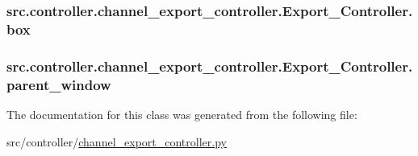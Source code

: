 \subsubsection[{box}]{\setlength{\rightskip}{0pt plus 5cm}src.\+controller.\+channel\+\_\+export\+\_\+controller.\+Export\+\_\+\+Controller.\+box}\label{classsrc_1_1controller_1_1channel__export__controller_1_1Export__Controller_a7e1fa47f17183e725dc98b6c4a15c9a9}
\hypertarget{classsrc_1_1controller_1_1channel__export__controller_1_1Export__Controller_ab5f83ab03c0824d54acd7a21e1f36813}{}
\subsubsection[{parent\+\_\+window}]{\setlength{\rightskip}{0pt plus 5cm}src.\+controller.\+channel\+\_\+export\+\_\+controller.\+Export\+\_\+\+Controller.\+parent\+\_\+window}\label{classsrc_1_1controller_1_1channel__export__controller_1_1Export__Controller_ab5f83ab03c0824d54acd7a21e1f36813}


The documentation for this class was generated from the following file\+:\begin{DoxyCompactItemize}
\item 
src/controller/\hyperlink{channel__export__controller_8py}{channel\+\_\+export\+\_\+controller.\+py}\end{DoxyCompactItemize}

